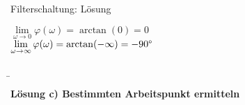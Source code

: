 \begin{frame}[allowframebreaks]
\begin{bsp}{Filterschaltung: Lösung}{}
\begin{minipage}{\textwidth}
\begin{minipage}[c][6cm][c]{0.48\textwidth}
            \qquad $\lim \limits_{\omega \to 0} \varphi(\omega) = \arctan(0) = 0$\\

            \qquad $\lim \limits_{\omega \to \infty} \varphi(\omega) = \arctan(-\infty) = -90\degree$\\
        \end{minipage}\hfill
        \begin{minipage}[c][6cm][c]{0.48\textwidth}
            \hfill
        \end{minipage}
    \end{minipage}

\b{\framebreak}%

\textbf{Lösung c) Bestimmten Arbeitspunkt ermitteln}\vspace{+5pt}


\end{bsp}
\end{frame}
